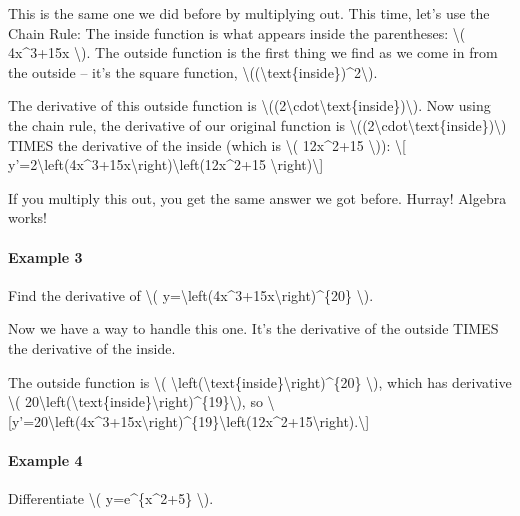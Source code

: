 This is the same one we did before by multiplying out. This time, let's
use the Chain Rule: The inside function is what appears inside the
parentheses: \textbackslash{}( 4x\^{}3+15x \textbackslash{}). The
outside function is the first thing we find as we come in from the
outside -- it's the square function,
\textbackslash{}((\textbackslash{}text\{inside\})\^{}2\textbackslash{}).

The derivative of this outside function is
\textbackslash{}((2\textbackslash{}cdot\textbackslash{}text\{inside\})\textbackslash{}).
Now using the chain rule, the derivative of our original function is
\textbackslash{}((2\textbackslash{}cdot\textbackslash{}text\{inside\})\textbackslash{})
TIMES the derivative of the inside (which is \textbackslash{}(
12x\^{}2+15 \textbackslash{})): \textbackslash{}{[}
y'=2\textbackslash{}left(4x\^{}3+15x\textbackslash{}right)\textbackslash{}left(12x\^{}2+15
\textbackslash{}right)\textbackslash{}{]}

If you multiply this out, you get the same answer we got before. Hurray!
Algebra works!

\hypertarget{example-3}{%
\paragraph{Example 3}\label{example-3}}

Find the derivative of \textbackslash{}(
y=\textbackslash{}left(4x\^{}3+15x\textbackslash{}right)\^{}\{20\}
\textbackslash{}).

Now we have a way to handle this one. It's the derivative of the outside
TIMES the derivative of the inside.

The outside function is \textbackslash{}(
\textbackslash{}left(\textbackslash{}text\{inside\}\textbackslash{}right)\^{}\{20\}
\textbackslash{}), which has derivative \textbackslash{}(
20\textbackslash{}left(\textbackslash{}text\{inside\}\textbackslash{}right)\^{}\{19\}\textbackslash{}),
so
\textbackslash{}{[}y'=20\textbackslash{}left(4x\^{}3+15x\textbackslash{}right)\^{}\{19\}\textbackslash{}left(12x\^{}2+15\textbackslash{}right).\textbackslash{}{]}

\hypertarget{example-4}{%
\paragraph{Example 4}\label{example-4}}

Differentiate \textbackslash{}( y=e\^{}\{x\^{}2+5\} \textbackslash{}).


